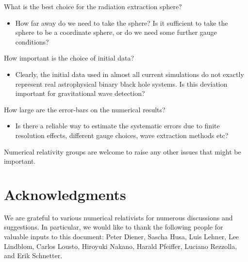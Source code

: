 \documentclass[prd,preprintnumbers,superscriptaddress,eqsecnum]{revtex4}
\numberwithin{equation}{section}
\begin{document}
What is the best choice for the radiation extraction sphere?
\begin{itemize}
\item How far away do we need to take the sphere?  Is it sufficient to
  take the sphere to be a coordinate sphere, or do we need some
  further gauge conditions?
\end{itemize}
How important is the choice of initial data?
\begin{itemize}
\item Clearly, the initial data used in almost all current simulations
  do not exactly represent real astrophysical binary black hole
  systems. Is this deviation important for gravitational wave
  detection?
\end{itemize}
How large are the error-bars on the numerical results?
\begin{itemize}
\item Is there a reliable way to estimate the systematic errors due to
  finite resolution effects, different gauge choices, wave extraction
  methods etc?
\end{itemize}

Numerical relativity groups are welcome to raise any other issues that
might be important.


\section*{Acknowledgments}

We are grateful to various numerical relativists for numerous
discussions and suggestions. In particular, we would like to thank the
following people for valuable inputs to this document: Peter Diener,
Sascha Husa, Luis Lehner, Lee Lindblom, Carlos Lousto, Hiroyuki
Nakano, Harald Pfeiffer, Luciano Rezzolla, and Erik Schnetter.
\end{document}
